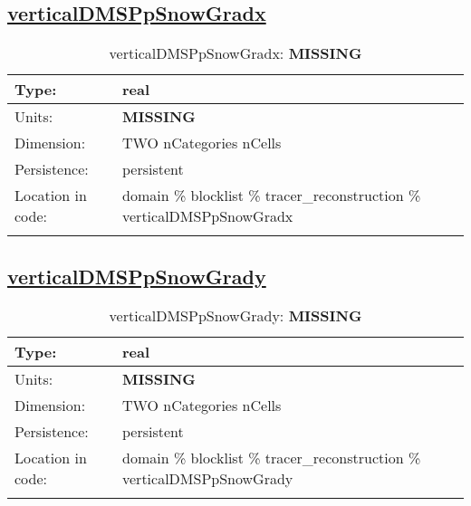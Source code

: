 \subsection[verticalDMSPpSnowGradx]{\hyperref[sec:var_tab_tracer_reconstruction]{verticalDMSPpSnowGradx}}
\label{subsec:var_sec_tracer_reconstruction_verticalDMSPpSnowGradx}
\begin{center}
\begin{longtable}{| p{2.0in} | p{4.0in} |}
        \hline 
        Type: & real \\
        \hline 
        Units: & {\bf \color{red} MISSING} \\
        \hline 
        Dimension: & TWO nCategories nCells \\
        \hline 
        Persistence: & persistent \\
        \hline 
         Location in code: & domain \% blocklist \% tracer\_reconstruction \% verticalDMSPpSnowGradx \\
         \hline 
    \caption{verticalDMSPpSnowGradx: {\bf \color{red} MISSING}}
\end{longtable}
\end{center}
\subsection[verticalDMSPpSnowGrady]{\hyperref[sec:var_tab_tracer_reconstruction]{verticalDMSPpSnowGrady}}
\label{subsec:var_sec_tracer_reconstruction_verticalDMSPpSnowGrady}
\begin{center}
\begin{longtable}{| p{2.0in} | p{4.0in} |}
        \hline 
        Type: & real \\
        \hline 
        Units: & {\bf \color{red} MISSING} \\
        \hline 
        Dimension: & TWO nCategories nCells \\
        \hline 
        Persistence: & persistent \\
        \hline 
         Location in code: & domain \% blocklist \% tracer\_reconstruction \% verticalDMSPpSnowGrady \\
         \hline 
    \caption{verticalDMSPpSnowGrady: {\bf \color{red} MISSING}}
\end{longtable}
\end{center}
